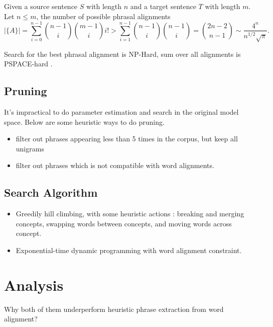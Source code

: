 \documentclass[11pt, letterpaper]{article}   	%
\begin{document}
Given a source sentence $S$ with length $n$ and a target sentence $T$ with length $m$.  Let $n \leqslant m $, the number of possible phrasal alignments 
\begin{equation}
|\{A\}|= \sum \limits_{i=0}^{n-1} {n-1 \choose i}{m-1 \choose i}i!  > \sum \limits_{i=1}^{n-1} {n-1 \choose i}{n-1 \choose i} = {2n-2 \choose n-1} \sim \frac{4^n}{n^{1/2} \sqrt{\pi}}.
\end{equation}

Search for the best phrasal alignment is NP-Hard, sum over all alignments is PSPACE-hard \cite{denero-acl-08}.


\subsection{Pruning}
It's impractical to do parameter estimation and search in the original model space. Below are some heuristic ways to do pruning.
\begin{itemize}
\item filter out phrases appearing less than 5 times in the corpus, but keep all unigrams \cite{marcu-wong-02}
\item filter out phrases which is not compatible with word alignments. \cite{denero-06-wmt}
\end{itemize}

\subsection{Search Algorithm}
\begin{itemize}
\item Greedily hill climbing, with some heuristic actions : breaking and merging concepts, swapping words between concepts, and moving words across concept. \cite{marcu-wong-02}
\item Exponential-time dynamic programming with word alignment constraint.  \cite{denero-06-wmt}
\end{itemize}

\section{Analysis}
Why both of them underperform heuristic phrase extraction from word alignment?
\end{document}
